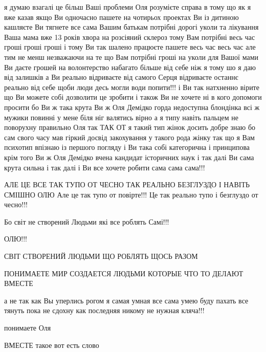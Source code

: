  
 
 
 
 

я думаю взагалі це більш Ваші проблеми Оля розумієте
справа в тому що як я вже казав
якщо Ви одночасно пашете на чотирьох проектах
Ви із дитиною кашляєте
Ви тягнете все сама
Вашим батькам потрібні дорогі уколи та лікування
Ваша мама вже 13 років хвора на розсіяний склероз
тому Вам потрібні весь час гроші гроші гроші
і тому Ви так шалено працюєте пашете весь час весь час
але тим не менш
незважаючи на те що Вам потрібні гроші на уколи для Вашої мами
Ви даєте грошей на волонтерство набагато більше від себе ніж я
тому шо я даю від залишків а Ви реально відриваєте від самого Серця
відриваєте останнє реально від себе щоби люди десь могли води попити!!!
і Ви так натхненно вірите
що 
   Ви можете собі дозволити це зробити
і також 
   Ви не хочете ні в кого допомоги просити
бо 
   Ви ж така крута Ви ж Оля Демідко горда недоступна блондінка 
      всі ж мужики повинні у мене біля ніг валятись вірно
         а я типу навіть пальцем не поворухну правильно Оля так
ТАК ОТ 
   я такий тип жінок досить добре знаю
       бо сам свого часу мав гіркий досвід закохування у такого рода жінку
          так що я Вам психотип впізнаю із першого погляду
і Ви така собі 
   категорична і принципова
      крім того Ви ж Оля Демідко вчена кандидат історичних наук і так далі
          Ви сама крута сильна і так далі і Ви все хочете робити сама сама сама!!!

АЛЕ ЦЕ ВСЕ ТАК ТУПО ОТ ЧЕСНО ТАК РЕАЛЬНО БЕЗГЛУЗДО І НАВІТЬ СМІШНО ОЛЮ
      Але це так тупо от повірте!!! Це так реально тупо і безглуздо от чесно!!!


Бо світ не створений Людьми які все роблять Самі!!!

ОЛЮ!!!

СВІТ СТВОРЕНИЙ ЛЮДЬМИ ЩО РОБЛЯТЬ ЩОСЬ РАЗОМ

ПОНИМАЕТЕ МИР СОЗДАЕТСЯ ЛЮДЬМИ КОТОРЫЕ ЧТО ТО ДЕЛАЮТ ВМЕСТЕ

а не так как Вы уперлись рогом я самая умная все сама умею буду
пахать все тянуть пока не сдохну как последняя никому не нужная кляча!!!

понимаете Оля

ВМЕСТЕ такое вот есть слово

